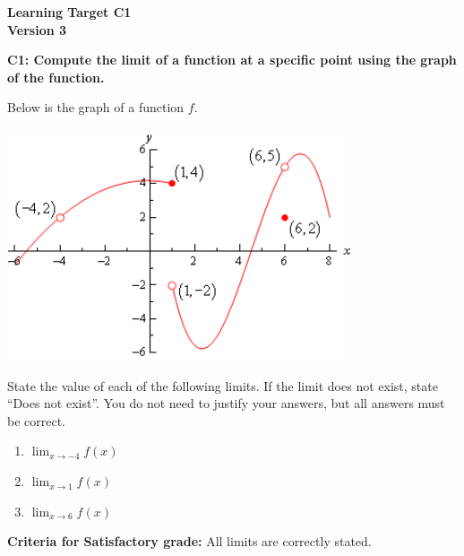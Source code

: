 \documentclass[10pt]{article}
\begin{document}
	\vspace*{0in}

		\begin{center}
			\textbf{Learning Target C1 \\
			Version 3} \\
		\end{center}


\begin{framed}
	\textbf{C1: Compute the limit of a function at a specific point using the graph of the function. }
\end{framed}

Below is the graph of a function $f$. 
\begin{center}
    \includegraphics[width=4in]{image004.png}
\end{center}
State the value of each of the following limits. If the limit does not exist, state ``Does not exist''. You do not need to justify your answers, but all answers must be correct. 

\begin{enumerate}
    \item $\displaystyle{\lim_{x \to -4} f(x)}$
    \item $\displaystyle{\lim_{x \to 1} f(x)}$
    \item $\displaystyle{\lim_{x \to 6} f(x)}$
\end{enumerate}


\vfill


\begin{small}
    \begin{framed}
        	\textbf{Criteria for Satisfactory grade:} All limits are correctly stated.
    \end{framed}

\end{small}
\end{document}
